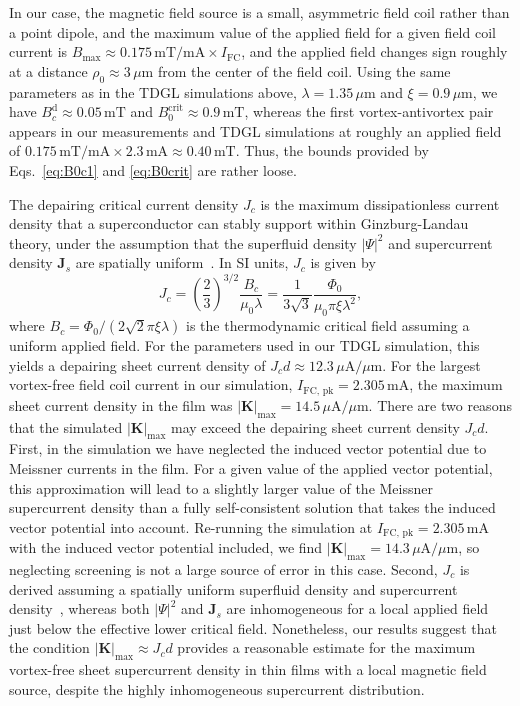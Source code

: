 \documentclass[%
 reprint,
 superscriptaddress,
 amsmath,
 amssymb,
 amsfonts,
 aps,
 prb,
]{revtex4-2}
\newcommand{\FC}{\mathrm{FC}}
\newcommand{\pk}{\mathrm{pk}}
\newcommand{\mA}{\mathrm{mA}}
\newcommand{\uA}{\mu\mathrm{A}}
\newcommand{\mT}{\mathrm{mT}}
\newcommand{\um}{\mu\mathrm{m}}
\begin{document}
In our case, the magnetic field source is a small, asymmetric field coil rather than a point dipole, and the maximum value of the applied field for a given field coil current is $B_\mathrm{max}\approx 0.175\,\mT/\mA\times I_\FC$, and the applied field changes sign roughly at a distance $\rho_0\approx3\,\um$ from the center of the field coil. Using the same parameters as in the TDGL simulations above, $\lambda=1.35\,\um$ and $\xi=0.9\,\um$, we have $B_{c}^\mathrm{d}\approx0.05\,\mT$ and $B_0^\mathrm{crit}\approx0.9\,\mT$, whereas the first vortex-antivortex pair appears in our measurements and TDGL simulations at roughly an applied field of $0.175\,\mT/\mA\times 2.3\,\mA \approx 0.40\,\mT$. Thus, the bounds provided by Eqs.~\ref{eq:B0c1} and \ref{eq:B0crit} are rather loose.

The depairing critical current density $J_c$ is the maximum dissipationless current density that a superconductor can stably support within Ginzburg-Landau theory, under the assumption that the superfluid density $|\Psi|^2$ and supercurrent density $\mathbf{J}_s$ are spatially uniform~\cite{Tinkham2004-ln}. In SI units, $J_c$ is given by
\begin{equation}
    J_c=\left(\frac{2}{3}\right)^{3/2}\frac{B_c}{\mu_0\lambda}=\frac{1}{3\sqrt{3}}\frac{\Phi_0}{\mu_0\pi\xi\lambda^2},
    \label{eq:Jc-GL}
\end{equation}
where $B_c=\Phi_0/(2\sqrt{2}\pi\xi\lambda)$ is the thermodynamic critical field assuming a uniform applied field.
For the parameters used in our TDGL simulation, this yields a depairing sheet current density of $J_cd\approx 12.3\,\uA/\um$. For the largest vortex-free field coil current in our simulation, $I_{\FC,\,\pk}=2.305\,\mA$, the maximum sheet current density in the film was $|\mathbf{K}|_\mathrm{max}=14.5\,\uA/\um$. There are two reasons that the simulated $|\mathbf{K}|_\mathrm{max}$ may exceed the depairing sheet current density $J_cd$. First, in the simulation we have neglected the induced vector potential due to Meissner currents in the film. For a given value of the applied vector potential, this approximation will lead to a slightly larger value of the Meissner supercurrent density than a fully self-consistent solution that takes the induced vector potential into account. Re-running the simulation at $I_{\FC,\,\pk}=2.305\,\mA$ with the induced vector potential included, we find $|\mathbf{K}|_\mathrm{max}=14.3\,\uA/\um$, so neglecting screening is not a large source of error in this case. Second, $J_c$ is derived assuming a spatially uniform superfluid density and supercurrent density~\cite{Tinkham2004-ln}, whereas both $|\Psi|^2$ and $\mathbf{J}_s$ are inhomogeneous for a local applied field just below the effective lower critical field. Nonetheless, our results suggest that the condition $|\mathbf{K}|_\mathrm{max}\approx J_cd$ provides a reasonable estimate for the maximum vortex-free sheet supercurrent density in thin films with a local magnetic field source, despite the highly inhomogeneous supercurrent distribution.
\end{document}
